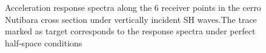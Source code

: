 \documentclass[11pt,letterpaper]{article}
\begin{document}
\begin{figure}[H]
	\center
	\caption{\small Acceleration response spectra along the 6 receiver points in the cerro Nutibara cross section under vertically incident SH waves.The trace marked as target corresponds to the response spectra under perfect half-space conditions}
 \label{fig:SaptosNutEWSH_fisica}
\end{figure}
\end{document}
